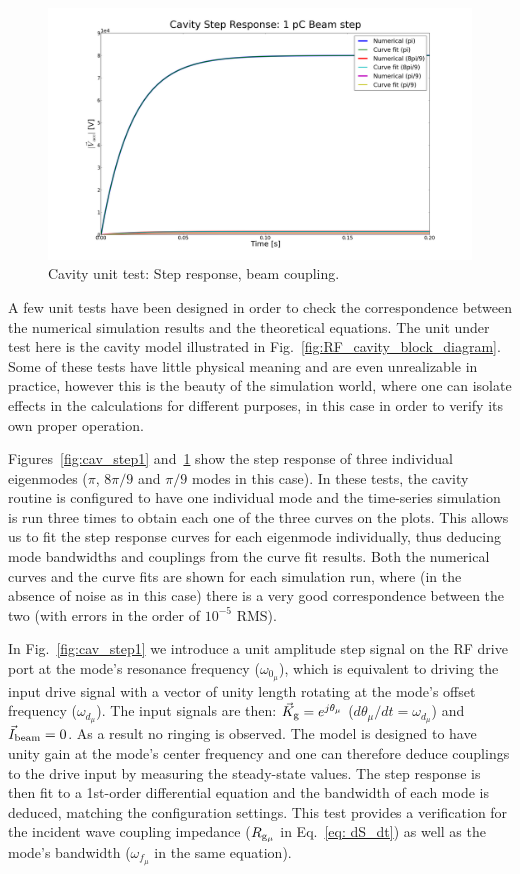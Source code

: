\documentclass[a4paper,12pt]{article}
\begin{document}
\begin{figure}
\centering
\includegraphics[scale=0.26]{../figures/cavity_test_beam.png}
\caption{Cavity unit test: Step response, beam coupling.}
\label{fig:cav_step2}
\end{figure}

A few unit tests have been designed in order to check the correspondence between the numerical simulation results and the theoretical equations. The unit under test here is the cavity model illustrated in Fig.~\ref{fig:RF_cavity_block_diagram}. Some of these tests have little physical meaning and are even unrealizable in practice, however this is the beauty of the simulation world, where one can isolate effects in the calculations for different purposes, in this case in order to verify its own proper operation.

Figures~\ref{fig:cav_step1} and~\ref{fig:cav_step2} show the step response of three individual eigenmodes ($\pi$, $8\pi/9$ and $\pi/9$ modes in this case). In these tests, the cavity routine is configured to have one individual mode and the time-series simulation is run three times to obtain each one of the three curves on the plots. This allows us to fit the step response curves for each eigenmode individually, thus deducing mode bandwidths and couplings from the curve fit results. Both the numerical curves and the curve fits are shown for each simulation run, where (in the absence of noise as in this case) there is a very good correspondence between the two (with errors in the order of $10^{-5}$ RMS).

In Fig.~\ref{fig:cav_step1} we introduce a unit amplitude step signal on the RF drive port at the mode's resonance frequency ($\omega_{0_{\mu}}$), which is equivalent to driving the input drive signal with a vector of unity length rotating at the mode's offset frequency ($\omega_{d_{\mu}}$). The input signals are then: $\vec K_{\rm g}=e^{j\theta_{\mu}}$ ($d\theta_{\mu}/dt = \omega_{d_\mu}$) and $\vec I_{\rm beam}=0$. As a result no ringing is observed. The model is designed to have unity gain at the mode's center frequency and one can therefore deduce couplings to the drive input by measuring the steady-state values. The step response is then fit to a 1st-order differential equation and the bandwidth of each mode is deduced, matching the configuration settings. This test provides a verification for the incident wave coupling impedance ($R_{\rm g_{\mu}}$ in Eq.~\ref{eq: dS_dt}) as well as the mode's bandwidth ($\omega_{f_{\mu}}$ in the same equation).
\end{document}
